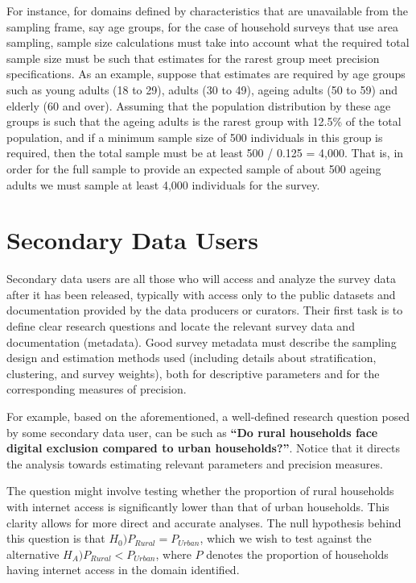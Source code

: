 \documentclass[
  12pt,
]{book}
\begin{document}
For instance, for domains defined by characteristics that are unavailable from the sampling frame, say age groups, for the case of household surveys that use area sampling, sample size calculations must take into account what the required total sample size must be such that estimates for the rarest group meet precision specifications. As an example, suppose that estimates are required by age groups such as young adults (18 to 29), adults (30 to 49), ageing adults (50 to 59) and elderly (60 and over). Assuming that the population distribution by these age groups is such that the ageing adults is the rarest group with 12.5\% of the total population, and if a minimum sample size of 500 individuals in this group is required, then the total sample must be at least 500 / 0.125 = 4,000. That is, in order for the full sample to provide an expected sample of about 500 ageing adults we must sample at least 4,000 individuals for the survey.

\hypertarget{secondary-data-users}{%
\section{Secondary Data Users}\label{secondary-data-users}}

Secondary data users are all those who will access and analyze the survey data after it has been released, typically with access only to the public datasets and documentation provided by the data producers or curators. Their first task is to define clear research questions and locate the relevant survey data and documentation (metadata). Good survey metadata must describe the sampling design and estimation methods used (including details about stratification, clustering, and survey weights), both for descriptive parameters and for the corresponding measures of precision.

For example, based on the aforementioned, a well-defined research question posed by some secondary data user, can be such as \textbf{``Do rural households face digital exclusion compared to urban households?''}. Notice that it directs the analysis towards estimating relevant parameters and precision measures.

The question might involve testing whether the proportion of rural households with internet access is significantly lower than that of urban households. This clarity allows for more direct and accurate analyses. The null hypothesis behind this question is that \(H_0) P_{Rural} = P_{Urban}\), which we wish to test against the alternative \(H_A) P_{Rural} < P_{Urban}\), where \(P\) denotes the proportion of households having internet access in the domain identified.
\end{document}
